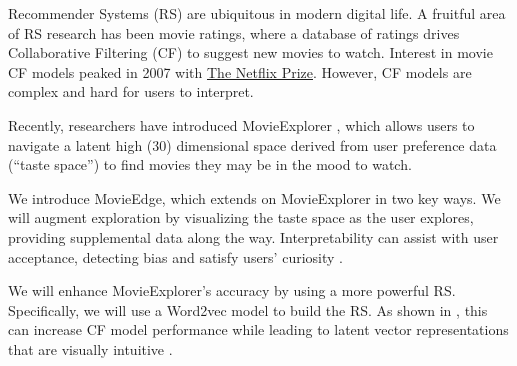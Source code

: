 Recommender Systems (RS) are ubiquitous in modern digital life. A fruitful area of RS research has been movie ratings, where a database of ratings drives Collaborative Filtering (CF) to suggest new movies to watch. Interest in movie CF models peaked in 2007 with \href{https://www.netflixprize.com/}{The Netflix Prize}. However, CF models are complex and hard for users to interpret.

Recently, researchers have introduced MovieExplorer \cite{taijala2018movieexplorer}, which allows users to navigate a latent high (30) dimensional space derived from user preference data (“taste space”) to find movies they may be in the mood to watch. 

We introduce MovieEdge, which extends on MovieExplorer in two key ways.  We will augment exploration by visualizing the taste space as the user explores, providing supplemental data along the way. Interpretability can assist with user acceptance, detecting bias and satisfy users’ curiosity \cite{Molnar2019interpretable}. 

We will enhance MovieExplorer’s accuracy  by using a more powerful RS. Specifically, we will use a Word2vec model \cite{mikolov2013distributed} to build the RS. As shown in \cite{ozsoy2016word}, this can increase CF model performance while leading to latent vector representations that are visually intuitive \cite{mikolov2013distributed}. 